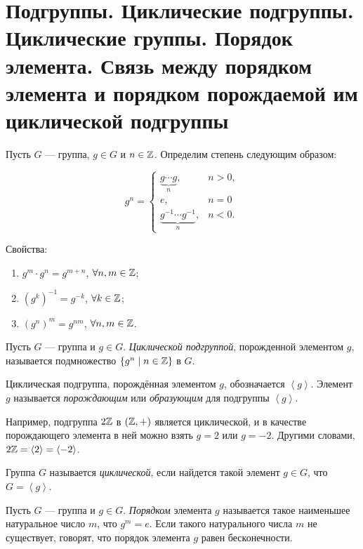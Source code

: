 \section{Подгруппы. Циклические подгруппы. Циклические группы. Порядок элемента. Связь между порядком элемента и порядком порождаемой им циклической подгруппы}

Пусть $G$ --- группа, $g \in G$ и $n \in \mathbb{Z}$. Определим степень следующим образом:

\begin{equation*}
    g^n = \begin{cases}
        \underbrace{g \cdots g}_n, &n > 0, \\
        e, &n = 0 \\
        \underbrace{g^{-1} \cdots g^{-1}}_n, &n < 0.
    \end{cases}
\end{equation*}

Свойства:
\begin{enumerate}
\item $g^{m} \cdot g^{n} = g^{m + n}$, $\forall n, m \in \mathbb{Z}$;
\item $\left(g^{k}\right)^{-1} = g^{-k}$, $\forall k \in \mathbb{Z}$;
\item $\left(g^{n}\right)^{m} = g^{nm}$, $\forall n, m \in \mathbb{Z}$.
\end{enumerate}

\begin{definition}
    Пусть $G$ --- группа и $g \in G$. \textit{Циклической подгруппой}, порожденной элементом $g$, называется подмножество $ \{g^{n} \mid n \in \mathbb{Z}\}$ в $G$.
\end{definition}

Циклическая подгруппа, порождённая элементом $g$, обозначается $\left< g \right>$. Элемент $g$ называется \textit{порождающим} или \textit{образующим} для подгруппы $\left< g \right>$.

Например, подгруппа $2\mathbb{Z}$ в $(\mathbb{Z}, +)$ является циклической, и в качестве порождающего элемента в ней можно взять $g = 2$ или $g = -2$. Другими словами, $2\mathbb{Z} = \left< 2 \right> = \left< -2 \right>$.

\begin{definition}
    Группа $G$ называется \textit{циклической}, если найдется такой элемент $g \in G$, что $G = \left< g \right>$.
\end{definition}

\begin{definition}
    Пусть $G$ --- группа и $g \in G$. \textit{Порядком} элемента $g$ называется такое наименьшее натуральное число $m$, что $g^{m} = e$. Если такого натурального числа $m$ не существует, говорят, что порядок элемента $g$ равен бесконечности.
\end{definition}

